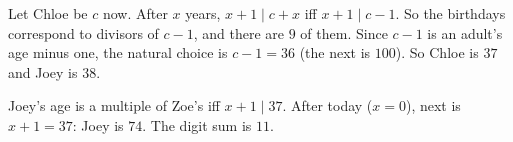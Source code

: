 Let Chloe be $c$ now. After $x$ years, $x+1\mid c+x$ iff $x+1\mid c-1$. So the birthdays correspond to divisors of $c-1$, and there are $9$ of them. Since $c-1$ is an adult's age minus one, the natural choice is $c-1=36$ (the next is $100$). So Chloe is $37$ and Joey is $38$.

Joey's age is a multiple of Zoe's iff $x+1\mid37$. After today ($x=0$), next is $x+1=37$: Joey is $74$. The digit sum is $\boxed{11}$.

